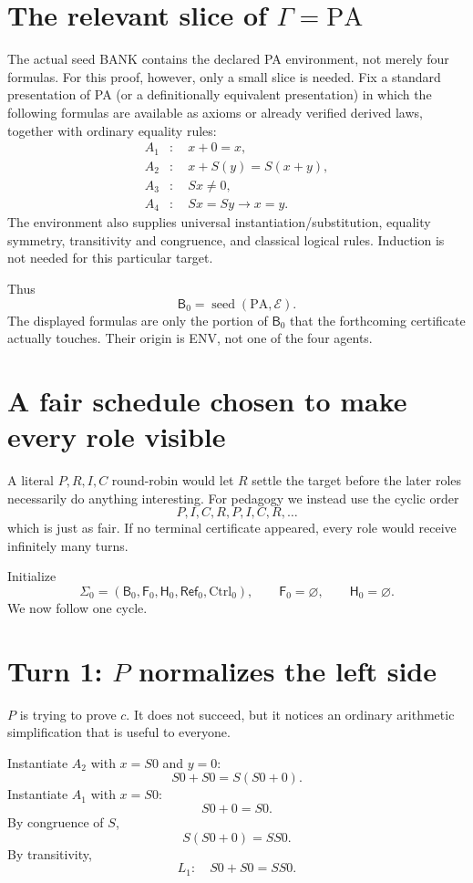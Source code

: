 \documentclass[11pt,openany]{book}
\theoremstyle{definition}
\theoremstyle{remark}
\newcommand{\Bank}{\mathsf{B}}
\newcommand{\Future}{\mathsf{F}}
\newcommand{\Hist}{\mathsf{H}}
\newcommand{\State}{\Sigma}
\newcommand{\Env}{\mathcal{E}}
\newcommand{\Refl}{\mathsf{Ref}}
\begin{document}
\section{The relevant slice of \texorpdfstring{$\Gamma=\mathrm{PA}$}{Gamma = PA}}
The actual seed BANK contains the declared PA environment, not merely four formulas. For this proof, however, only a small slice is needed. Fix a standard presentation of PA (or a definitionally equivalent presentation) in which the following formulas are available as axioms or already verified derived laws, together with ordinary equality rules:
\begin{align*}
A_1&:\quad x+0=x,\\
A_2&:\quad x+S(y)=S(x+y),\\
A_3&:\quad Sx\neq0,\\
A_4&:\quad Sx=Sy\rightarrow x=y.
\end{align*}
The environment also supplies universal instantiation/substitution, equality symmetry, transitivity and congruence, and classical logical rules. Induction is not needed for this particular target.

Thus
\[
\Bank_0=\operatorname{seed}(\mathrm{PA},\Env).
\]
The displayed formulas are only the portion of $\Bank_0$ that the forthcoming certificate actually touches. Their origin is \textsf{ENV}, not one of the four agents.

\section{A fair schedule chosen to make every role visible}
A literal $P,R,I,C$ round-robin would let $R$ settle the target before the later roles necessarily do anything interesting. For pedagogy we instead use the cyclic order
\[
P,I,C,R,P,I,C,R,\ldots
\]
which is just as fair. If no terminal certificate appeared, every role would receive infinitely many turns.

Initialize
\[
\State_0=(\Bank_0,\Future_0,\Hist_0,\Refl_0,\mathrm{Ctrl}_0),
\qquad
\Future_0=\varnothing,
\qquad
\Hist_0=\varnothing.
\]
We now follow one cycle.

\section{Turn 1: \texorpdfstring{$P$}{P} normalizes the left side}
$P$ is trying to prove $c$. It does not succeed, but it notices an ordinary arithmetic simplification that is useful to everyone.

Instantiate $A_2$ with $x=S0$ and $y=0$:
\[
S0+S0=S(S0+0).
\]
Instantiate $A_1$ with $x=S0$:
\[
S0+0=S0.
\]
By congruence of $S$,
\[
S(S0+0)=SS0.
\]
By transitivity,
\[
L_1:\quad S0+S0=SS0.
\]
\end{document}
